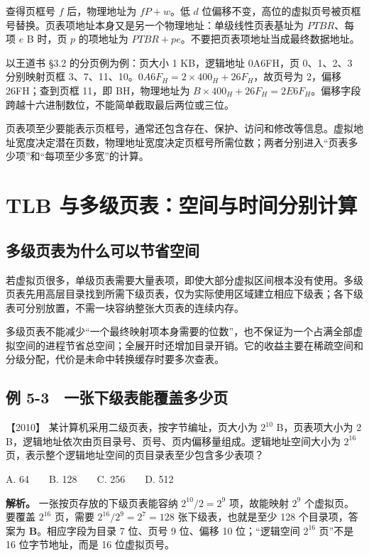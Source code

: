 查得页框号 \(f\) 后，物理地址为 \(fP+w\)。低 \(d\) 位偏移不变，高位的虚拟页号被页框号替换。页表项地址本身又是另一个物理地址：单级线性页表基址为 \(PTBR\)、每项 \(e\) B 时，页 \(p\) 的项地址为 \(PTBR+pe\)。不要把页表项地址当成最终数据地址。

以王道书 §3.2 的分页例为例：页大小 1 KB，逻辑地址 0A6FH，页 0、1、2、3 分别映射页框 3、7、11、10。\(0A6F_H=2\times400_H+26F_H\)，故页号为 2，偏移 26FH；查到页框 11，即 BH，物理地址为 \(B\times400_H+26F_H=2E6F_H\)。偏移字段跨越十六进制数位，不能简单截取最后两位或三位。

页表项至少要能表示页框号，通常还包含存在、保护、访问和修改等信息。虚拟地址宽度决定潜在页数，物理地址宽度决定页框号所需位数；两者分别进入``页表多少项''和``每项至少多宽''的计算。

\section{TLB 与多级页表：空间与时间分别计算}\label{os-5-5}

\subsection{多级页表为什么可以节省空间}\label{os-c05-h79}

若虚拟页很多，单级页表需要大量表项，即使大部分虚拟区间根本没有使用。多级页表先用高层目录找到所需下级页表，仅为实际使用区域建立相应下级表；各下级表可分别放置，不需一块容纳整张大页表的连续内存。

多级页表不能减少``一个最终映射项本身需要的位数''，也不保证为一个占满全部虚拟空间的进程节省总空间；全展开时还增加目录开销。它的收益主要在稀疏空间和分级分配，代价是未命中转换缓存时要多次查表。

\subsection{例 5-3　一张下级表能覆盖多少页}\label{os-ex5-3}

\noindent{}【2010】 某计算机采用二级页表，按字节编址，页大小为 \(2^{10}\) B，页表项大小为 2 B，逻辑地址依次由页目录号、页号、页内偏移量组成。逻辑地址空间大小为 \(2^{16}\) 页，表示整个逻辑地址空间的页目录表至少包含多少表项？

A. 64　　B. 128　　C. 256　　D. 512


\textbf{解析。} 一张按页存放的下级页表能容纳 \(2^{10}/2=2^9\) 项，故能映射 \(2^9\) 个虚拟页。要覆盖 \(2^{16}\) 页，需要 \(2^{16}/2^9=2^7=128\) 张下级表，也就是至少 128 个目录项，答案为 \textbf{B}。相应字段为目录 7 位、页号 9 位、偏移 10 位；``逻辑空间 \(2^{16}\) 页''不是 16 位字节地址，而是 16 位虚拟页号。

